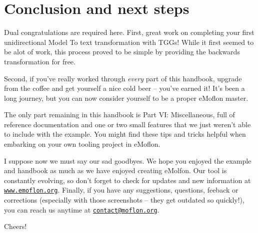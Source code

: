 \newpage
\section{Conclusion and next steps}
\genHeader

Dual congratulations are required here. First, great work on completing your first unidirectional Model To text transformation with TGGs! While it first seemed
to be alot of work, this process proved to be simple by providing the backwards transformation for free.

Second, if you've really worked through \emph{every} part of this handbook, upgrade from the coffee and get yourself a nice cold beer -- you've earned it! It's
been a long journey, but you can now consider yourself to be a proper eMoflon master.

The only part remaining in this handbook is Part VI: Miscellaneous, full of reference documentation and one or two small features that we just weren't able to
include with the example. You might find these tips and tricks helpful when embarking on your own tooling project in eMoflon.

I suppose now we must say our sad goodbyes. We hope you enjoyed the example and handbook as much as we have enjoyed creating eMolfon. Our tool is constantly
evolving, so don't forget to check for updates and new information at \texttt{\url{www.emoflon.org}}. Finally, if you have any suggestions, questions, feeback
or corrections (especially with those screenshots -- they get outdated so quickly!), you can reach us anytime at
\texttt{\href{mailto:contact@moflon.org}{contact@moflon.org}}.

Cheers!
